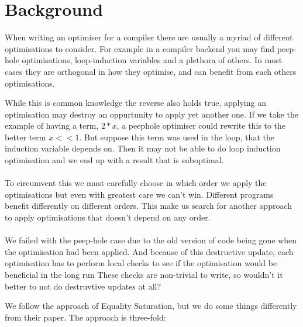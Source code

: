 
\section{Background}
When writing an optimiser for a compiler there are usually a myriad of different optimisations to consider.
For example in a compiler backend you may find peep-hole\cite{peephole}
optimisations, loop-induction variables\cite{loop-induction} and a plethora of others. In most cases 
they are orthogonal in how they optimise, and can benefit from each others optimisations.

While this is common knowledge the reverse also holds true, applying an optimisation 
may destroy an oppurtunity to apply yet another one. If we take the example of having a 
term, $ 2 * x $, a peephole optimiser could rewrite this to the better term 
$ x << 1$. But suppose this term was used in the loop, that the induction variable
depends on. Then it may not be able to do loop induction optimisation and we end up
with a result that is suboptimal.%
\paragraph{}
To circumvent this we must carefully choose in which order we apply the optimisations
but even with greatest care we can't win. Different programs benefit differently
on different orders. This make us search for another approach to apply optimisations
that doesn't depend on any order. 
\paragraph{}
We failed with the peep-hole case due to the old version of code being gone when 
the optimisation had been applied.
And because of this destructive update, each
optimisation has to perform local checks to see if the optimisation would be beneficial in the long run %
These checks are non-trivial to write, so wouldn't it better to not do destruvtive
updates at all?

We follow the approach of Equality Saturation\cite{eqSat}, but we do some things
differently from their paper. The approach is three-fold:

